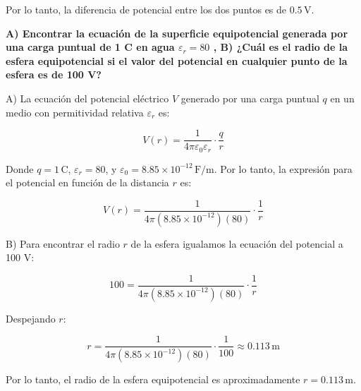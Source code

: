 \documentclass[answers]{exam} %
\begin{document}
\begin{questions}
	Por lo tanto, la diferencia de potencial entre los dos puntos es de \(0.5 \, \text{V}\).

	\begin{center}
	\end{center}

	\vspace{0.5cm}
	\question \large\textbf{A) Encontrar la ecuación de la superficie equipotencial generada por una carga puntual de 1 C en agua $\varepsilon_r = 80$ , B) ¿Cuál es el radio de la esfera equipotencial si el valor del potencial en cualquier punto de la esfera es de 100 V?}

	A) La ecuación del potencial eléctrico $V$ generado por una carga puntual $q$ en un medio con permitividad relativa $\varepsilon_r$ es:

	\[
		V(r) = \frac{1}{4\pi \varepsilon_0 \varepsilon_r} \cdot \frac{q}{r}
	\]

	Donde $q = 1 \, \text{C}$, $\varepsilon_r = 80$, y $\varepsilon_0 = 8.85 \times 10^{-12} \, \text{F/m}$. Por lo tanto, la expresión para el potencial en función de la distancia $r$ es:

	\[
		V(r) = \frac{1}{4\pi (8.85 \times 10^{-12})(80)} \cdot \frac{1}{r}
	\]

	B) Para encontrar el radio $r$ de la esfera igualamos la ecuación del potencial a 100 V:

	\[
		100 = \frac{1}{4\pi (8.85 \times 10^{-12})(80)} \cdot \frac{1}{r}
	\]

	Despejando $r$:

	\[
		r = \frac{1}{4\pi (8.85 \times 10^{-12})(80)} \cdot \frac{1}{100} \approx 0.113 \, \text{m}
	\]

	Por lo tanto, el radio de la esfera equipotencial es aproximadamente $r = 0.113 \, \text{m}$.


\end{questions}
\end{document}
